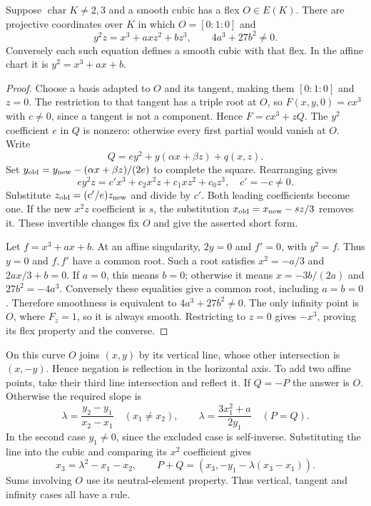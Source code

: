\begin{proposition}\label{geometry:prop:weierstrass}
Suppose $\operatorname{char}K\ne2,3$ and a smooth cubic has a flex $O\in E(K)$. There are projective coordinates over $K$ in which $O=[0:1:0]$ and
\[
y^2z=x^3+axz^2+bz^3,\qquad 4a^3+27b^2\ne0.
\]
Conversely each such equation defines a smooth cubic with that flex. In the affine chart it is $y^2=x^3+ax+b$.
\end{proposition}
\begin{proof}
Choose a basis adapted to $O$ and its tangent, making them $[0:1:0]$ and $z=0$. The restriction to that tangent has a triple root at $O$, so $F(x,y,0)=cx^3$ with $c\ne0$, since a tangent is not a component. Hence $F=cx^3+zQ$. The $y^2$ coefficient $e$ in $Q$ is nonzero: otherwise every first partial would vanish at $O$. Write
\[
Q=ey^2+y(\alpha x+\beta z)+q(x,z).
\]
Set $y_{\rm old}=y_{\rm new}-(\alpha x+\beta z)/(2e)$ to complete the square. Rearranging gives
\[
ey^2z=c'x^3+c_2x^2z+c_1xz^2+c_0z^3,\quad c'=-c\ne0.
\]
Substitute $z_{\rm old}=(c'/e)z_{\rm new}$ and divide by $c'$. Both leading coefficients become one. If the new $x^2z$ coefficient is $s$, the substitution $x_{\rm old}=x_{\rm new}-sz/3$ removes it. These invertible changes fix $O$ and give the asserted short form.

Let $f=x^3+ax+b$. At an affine singularity, $2y=0$ and $f'=0$, with $y^2=f$. Thus $y=0$ and $f,f'$ have a common root. Such a root satisfies $x^2=-a/3$ and $2ax/3+b=0$. If $a=0$, this means $b=0$; otherwise it means $x=-3b/(2a)$ and $27b^2=-4a^3$. Conversely these equalities give a common root, including $a=b=0$. Therefore smoothness is equivalent to $4a^3+27b^2\ne0$. The only infinity point is $O$, where $F_z=1$, so it is always smooth. Restricting to $z=0$ gives $-x^3$, proving its flex property and the converse.
\end{proof}

On this curve $O$ joins $(x,y)$ by its vertical line, whose other intersection is $(x,-y)$. Hence negation is reflection in the horizontal axis. To add two affine points, take their third line intersection and reflect it. If $Q=-P$ the answer is $O$. Otherwise the required slope is
\[
\lambda=\frac{y_2-y_1}{x_2-x_1}\quad(x_1\ne x_2),\qquad
\lambda=\frac{3x_1^2+a}{2y_1}\quad(P=Q).
\]
In the second case $y_1\ne0$, since the excluded case is self-inverse. Substituting the line into the cubic and comparing its $x^2$ coefficient gives
\[
x_3=\lambda^2-x_1-x_2,\qquad
P+Q=(x_3,-y_1-\lambda(x_3-x_1)).
\]
Sums involving $O$ use its neutral-element property. Thus vertical, tangent and infinity cases all have a rule.


